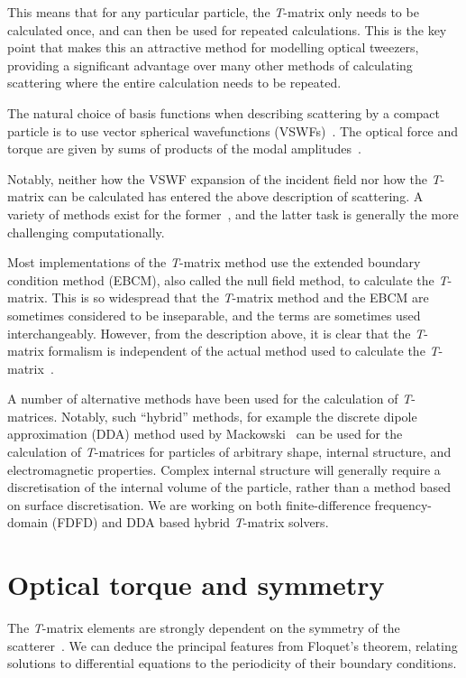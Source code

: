 This means
that for any particular particle, the \textit{T}-matrix only needs to be
calculated once, and can then be used for repeated calculations.
This is the key point that makes this an attractive method for modelling
optical tweezers, providing a
significant advantage over many other methods of calculating scattering where
the entire calculation needs to be repeated.

The natural choice of basis functions when describing scattering
by a compact particle is to use vector spherical wavefunctions
(VSWFs)~\cite{waterman1971}.
The optical force and torque are given by sums of products of the modal
amplitudes~\cite{farsund1996,crichton2000,nieminen2004d}.

Notably, neither how the VSWF expansion of the incident field nor how
the \textit{T}-matrix can be calculated has entered the above description
of scattering.
A variety of methods exist for the
former~\cite{nieminen2003a,nieminen2004d}, and the latter task is generally
the more challenging computationally.

Most implementations of the \textit{T}-matrix method use the extended
boundary condition method (EBCM), also called the null field method, to
calculate the \textit{T}-matrix. This is so widespread that the
\textit{T}-matrix method and the EBCM are sometimes considered to be
inseparable, and the terms are sometimes used interchangeably.
However, from the description above, it is clear that the \textit{T}-matrix
formalism is independent of the actual method used to calculate the
\textit{T}-matrix~\cite{kahnert2003b,nieminen2003b}.

A number of alternative methods have been used for the calculation of
\textit{T}-matrices.
Notably, such ``hybrid'' methods, for example the discrete dipole
approximation (DDA) method used by
Mackowski~\cite{mackowski2002} can be used for the calculation of
\textit{T}-matrices for particles of arbitrary shape, internal structure,
and electromagnetic properties. Complex internal structure will generally
require a discretisation of the internal volume of the particle, rather
than a method based on surface discretisation. We are working on
both finite-difference frequency-domain (FDFD) and DDA
based hybrid \textit{T}-matrix solvers.

\section{Optical torque and symmetry}

The \textit{T}-matrix elements are strongly dependent on the symmetry
of the scatterer~\cite{waterman1971}. We can deduce the principal features
from Floquet's theorem, relating solutions to differential equations to
the periodicity of their boundary conditions.

